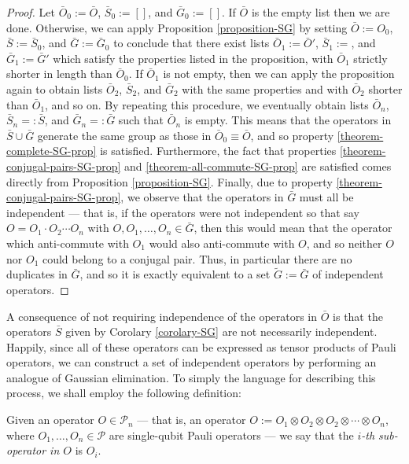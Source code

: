 \documentclass[twocolumn,showpacs,preprintnumbers,amsmath,amssymb,nofootinbib,pra,floatfix]{revtex4}
\newenvironment{definition}[1][Definition]{\begin{trivlist}
\item[\hskip \labelsep {\bfseries #1}]}{\end{trivlist}}
\newenvironment{remark}[1][Remark]{\begin{trivlist}
\item[\hskip \labelsep {\bfseries #1}]}{\end{trivlist}}
\begin{document}
\begin{proof}
Let $\bar O_0:=\bar O$, $\bar S_0:=[]$, and $\bar G_0:=[]$.  If $\bar O$ is the empty list then we are done.  Otherwise, we can apply Proposition \ref{proposition-SG} by setting $\bar O := O_0$, $\bar S:=\bar S_0$, and $\bar G := \bar G_0$ to conclude that there exist lists $\bar O_1:=\bar O'$, $\bar S_1:=$, and $\bar G_1:=\bar G'$ which satisfy the properties listed in the proposition, with $\bar O_1$ strictly shorter in length than $\bar O_0$.  If $\bar O_1$ is not empty, then we can apply the proposition again to obtain lists $\bar O_2$, $\bar S_2$, and $\bar G_2$ with the same properties and with $\bar O_2$ shorter than $\bar O_1$, and so on.  By repeating this procedure, we eventually obtain lists $\bar O_n$, $\bar S_n=:\bar S$, and $\bar G_n=:\bar G$ such that $\bar O_n$ is empty.  This means that the operators in $\bar S \cup \bar G$ generate the same group as those in $\bar O_0\equiv \bar O$, and so property \ref{theorem-complete-SG-prop} is satisfied.  Furthermore, the fact that properties \ref{theorem-conjugal-pairs-SG-prop} and \ref{theorem-all-commute-SG-prop} are satisfied comes directly from Proposition \ref{proposition-SG}.  Finally, due to property \ref{theorem-conjugal-pairs-SG-prop}, we observe that the operators in $\bar G$ must all be independent --- that is, if the operators were not independent so that say $O=O_1\cdot O_2\cdots O_n$ with $O,O_1,\dots,O_n\in\bar G$, then this would mean that the operator which anti-commute with $O_1$ would also anti-commute with $O$, and so neither $O$ nor $O_1$ could belong to a conjugal pair.  Thus, in particular there are no duplicates in $\bar G$, and so it is exactly equivalent to a set $\tilde G:=\bar G$ of independent operators.
\end{proof}

\begin{remark}
A consequence of not requiring independence of the operators in $\bar O$ is that the operators $\bar S$ given by Corolary \ref{corolary-SG} are not necessarily independent.  Happily, since all of these operators can be expressed as tensor products of Pauli operators, we can construct a set of independent operators by performing an analogue of Gaussian elimination.  To simply the language for describing this process, we shall employ the following definition:
\end{remark}

\begin{definition}
Given an operator $O\in \mathcal{P}_n$ --- that is, an operator $O:=O_1\otimes O_2 \otimes O_2 \otimes \cdots \otimes O_n$, where $O_1,\dots,O_n\in\mathcal{P}$ are single-qubit Pauli operators --- we say that the \emph{$i$-th sub-operator in $O$} is $O_i$.
\end{definition}
\end{document}
